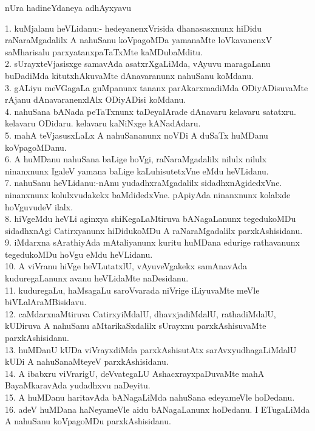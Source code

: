 \documentclass{article}
\begin{document}
\begin{center}
nUra hadineYdaneya adhAyxyavu
\end{center}

1. kuMjalanu heVLidanu:- hedeyanenxVrisida dhanasasxnunx hiDidu raNaraMgadalilx A nahuSanu koVpagoMDa yamanaMte loVkavanenxV saMharisalu parxyatanxpaTaTxMte kaMDubaMditu.\\
2. sUrayxteVjasisxge samavAda asatxrXgaLiMda, vAyuvu maragaLanu buDadiMda kitutxhAkuvaMte dAnavaranunx nahuSanu koMdanu.\\
3. gALiyu meVGagaLa guMpanunx tananx parAkarxmadiMda ODiyADisuvaMte rAjanu dAnavaranenxlAlx ODiyADisi koMdanu.\\
4. nahuSana bANada peTaTxnunx taDeyalArade dAnavaru kelavaru satatxru. kelavaru ODidaru. kelavaru kaNiNxge kANadAdaru.\\
5. mahA teVjasusxLaLx A nahuSananunx noVDi A duSaTx huMDanu koVpagoMDanu.\\
6. A huMDanu nahuSana baLige hoVgi, raNaraMgadalilx nilulx nilulx ninanxnunx IgaleV yamana baLige kaLuhisutetxVne eMdu heVLidanu.\\
7. nahuSanu heVLidanu:-nAnu yudadhxraMgadalilx sidadhxnAgidedxVne. ninanxnunx kolulxvudakekx baMdidedxVne. pApiyAda ninanxnunx kolalxde hoVguvudeV ilalx.\\
8. hiVgeMdu heVLi aginxya shiKegaLaMtiruva bANagaLanunx tegedukoMDu sidadhxnAgi Catirxyanunx hiDidukoMDu A raNaraMgadalilx parxkAshisidanu.\\
9. iMdarxna sArathiyAda mAtaliyanunx kuritu huMDana edurige rathavanunx tegedukoMDu hoVgu eMdu heVLidanu.\\
10. A viVranu hiVge heVLutatxlU, vAyuveVgakekx samAnavAda kuduregaLanunx avanu heVLidaMte naDesidanu.\\
11. kuduregaLu, haMsagaLu saroVvarada niVrige iLiyuvaMte meVle biVLalAraMBisidavu.\\
12. caMdarxnaMtiruva CatirxyiMdalU, dhavxjadiMdalU, rathadiMdalU, kUDiruva A nahuSanu aMtarikaSxdalilx sUrayxnu parxkAshisuvaMte parxkAshisidanu.\\
13. huMDanU kUDa viVrayxdiMda parxkAshisutAtx sarAvxyudhagaLiMdalU kUDi A nahuSanaMteyeV parxkAshisidanu.\\
14. A ibabxru viVrarigU, deVvategaLU AshacxrayxpaDuvaMte mahA BayaMkaravAda yudadhxvu naDeyitu.\\
15. A huMDanu haritavAda bANagaLiMda nahuSana edeyameVle hoDedanu.\\
16. adeV huMDana haNeyameVle aidu bANagaLanunx hoDedanu. I ETugaLiMda A nahuSanu koVpagoMDu parxkAshisidanu.\\
\end{document}
